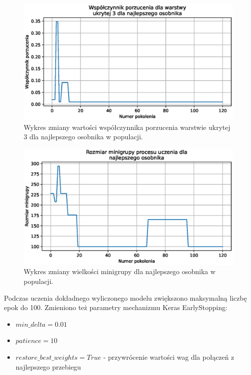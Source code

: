 \documentclass[a4paper,12pt]{article}
\numberwithin{figure}{section}
\begin{document}
    \begin{figure}[H]
        \centering
        \includegraphics[width=\textwidth]{g_a_best_hidden_3_dropout_rate}
        \caption{Wykres zmiany wartości współczynnika porzucenia warstwie ukrytej 3 dla najlepszego osobnika w populacji.}
        \label{fig:g_a_best_hidden_3_dropout_rate}
    \end{figure}

    \smallskip

    \begin{figure}[H]
        \centering
        \includegraphics[width=\textwidth]{g_a_best_batch_size}
        \caption{Wykres zmiany wielkości minigrupy dla najlepszego osobnika w populacji.}
        \label{fig:g_a_best_batch_size}
    \end{figure}

    \bigskip

    Podczas uczenia dokładnego wyliczonego modelu zwiększono maksymalną liczbę epok do 100. Zmieniono też parametry mechanizmu Keras EarlyStopping:
    \begin{itemize}
        \item $min\_delta=0.01$
        \item $patience=10$
        \item $restore\_best\_weights=True$ - przywrócenie wartości wag dla połączeń z najlepszego przebiegu
    \end{itemize}
\end{document}
